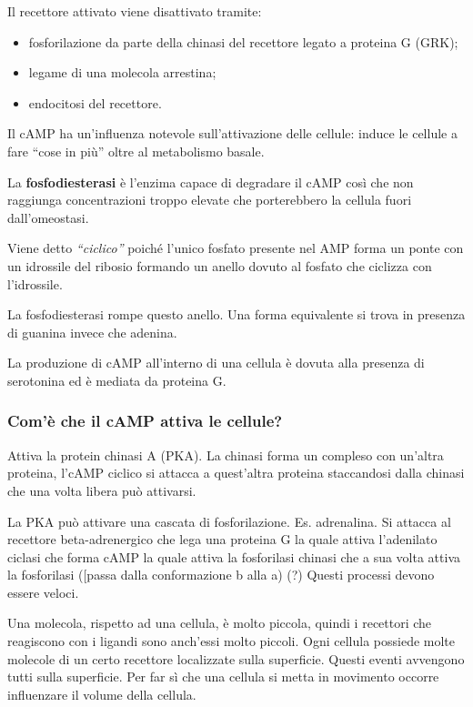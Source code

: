 \documentclass[]{article}
\begin{document}
Il recettore attivato viene disattivato tramite:

\begin{itemize}
\itemsep1pt\parskip0pt
\item
  fosforilazione da parte della chinasi del recettore legato a proteina
  G (GRK);
\item
  legame di una molecola arrestina;
\item
  endocitosi del recettore.
\end{itemize}

Il cAMP ha un'influenza notevole sull'attivazione delle cellule: induce
le cellule a fare ``cose in più'' oltre al metabolismo basale.

La \textbf{fosfodiesterasi} è l'enzima capace di degradare il cAMP così
che non raggiunga concentrazioni troppo elevate che porterebbero la
cellula fuori dall'omeostasi.

Viene detto \emph{``ciclico''} poiché l'unico fosfato presente nel AMP
forma un ponte con un idrossile del ribosio formando un anello dovuto al
fosfato che ciclizza con l'idrossile.

La fosfodiesterasi rompe questo anello. Una forma equivalente si trova
in presenza di guanina invece che adenina.

La produzione di cAMP all'interno di una cellula è dovuta alla presenza
di serotonina ed è mediata da proteina G.

\subsubsection{Com'è che il cAMP attiva le
cellule?}\label{comuxe8-che-il-camp-attiva-le-cellule}

Attiva la protein chinasi A (PKA). La chinasi forma un compleso con
un'altra proteina, l'cAMP ciclico si attacca a quest'altra proteina
staccandosi dalla chinasi che una volta libera può attivarsi.

La PKA può attivare una cascata di fosforilazione. Es. adrenalina. Si
attacca al recettore beta-adrenergico che lega una proteina G la quale
attiva l'adenilato ciclasi che forma cAMP la quale attiva la fosforilasi
chinasi che a sua volta attiva la fosforilasi ({[}passa dalla
conformazione b alla a) (?) Questi processi devono essere veloci.

Una molecola, rispetto ad una cellula, è molto piccola, quindi i
recettori che reagiscono con i ligandi sono anch'essi molto piccoli.
Ogni cellula possiede molte molecole di un certo recettore localizzate
sulla superficie. Questi eventi avvengono tutti sulla superficie. Per
far sì che una cellula si metta in movimento occorre influenzare il
volume della cellula.
\end{document}
